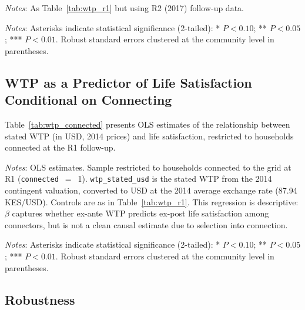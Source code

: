 \documentclass[letter,12pt]{article}
\newcommand{\starnote}{
  \noindent\emph{Notes}: Asterisks indicate statistical significance (2-tailed):
  * $P < 0.10$; ** $P < 0.05$; *** $P < 0.01$.
  Robust standard errors clustered at the community level in parentheses.
}
\begin{document}
\clearpage

\begin{table}[H]
  \centering
  \caption{\textbf{Heterogeneous TOT on Wellbeing by Baseline WTP --- R2 (2017)}}
  \label{tab:wtp_r2}
  \vspace{0.5em}
  
  \vspace{0.5em}
  \begin{minipage}{\linewidth}
    \small
    \emph{Notes}: As Table~\ref{tab:wtp_r1} but using R2 (2017) follow-up data.
    \starnote
  \end{minipage}
\end{table}

\restoregeometry

\subsection{WTP as a Predictor of Life Satisfaction Conditional on Connecting}

Table~\ref{tab:wtp_connected} presents OLS estimates of the relationship
between stated WTP (in USD, 2014 prices) and life satisfaction, restricted
to households connected at the R1 follow-up.

\clearpage
{}

\begin{table}[H]
  \centering
  \caption{\textbf{WTP as Predictor of Wellbeing Conditional on Connection --- R1 (2016)}}
  \label{tab:wtp_connected}
  \vspace{0.5em}
  
  \vspace{0.5em}
  \begin{minipage}{\linewidth}
    \small
    \emph{Notes}: OLS estimates. Sample restricted to households connected to
    the grid at R1 (\texttt{connected}~$=$~1). \texttt{wtp\_stated\_usd} is
    the stated WTP from the 2014 contingent valuation, converted to USD at
    the 2014 average exchange rate (87.94 KES/USD). Controls are as in
    Table~\ref{tab:wtp_r1}. This regression is descriptive: $\beta$ captures
    whether ex-ante WTP predicts ex-post life satisfaction among connectors,
    but is not a clean causal estimate due to selection into connection.
    \starnote
  \end{minipage}
\end{table}

\restoregeometry

\subsection{Robustness}
\end{document}
